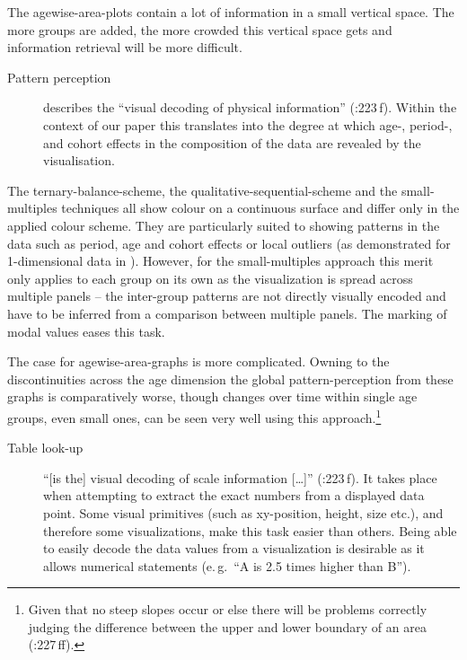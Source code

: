 \documentclass[parskip=half]{scrartcl}
\begin{document}
The agewise-area-plots contain a lot of information in a small vertical space. The more groups are added, the more crowded this vertical space gets and information retrieval will be more difficult.

\begin{description}
  \item[Pattern perception] describes the \enquote{visual decoding of physical information} (\cite{Cleveland1994}:223\,f). Within the context of our paper this translates into the degree at which age-, period-, and cohort effects in the composition of the data are revealed by the visualisation.
\end{description}

The ternary-balance-scheme, the qualitative-sequential-scheme and the small-multiples techniques all show colour on a continuous surface and differ only in the applied colour scheme. They are particularly suited to showing patterns in the data such as period, age and cohort effects or local outliers (as demonstrated for 1-dimensional data in \cite{Vaupel1987a}). However, for the small-multiples approach this merit only applies to each group on its own as the visualization is spread across multiple panels -- the inter-group patterns are not directly visually encoded and have to be inferred from a comparison between multiple panels. The marking of modal values eases this task.

The case for agewise-area-graphs is more complicated. Owning to the discontinuities across the age dimension the global pattern-perception from these graphs is comparatively worse, though changes over time within single age groups, even small ones, can be seen very well using this approach.\footnote{
  Given that no steep slopes occur or else there will be problems correctly judging the difference between the upper and lower boundary of an area (\cite{Cleveland1994}:227\,ff).
}

\begin{description}
  \item[Table look-up] \enquote{[is the] visual decoding of scale information [\ldots]} (\cite{Cleveland1994}:223\,f). It takes place when attempting to extract the exact numbers from a displayed data point. Some visual primitives (such as xy-position, height, size etc.), and therefore some visualizations, make this task easier than others. Being able to easily decode the data values from a visualization is desirable as it allows numerical statements (e.\,g.~\enquote{A is 2.5 times higher than B}).
\end{description}
\end{document}
